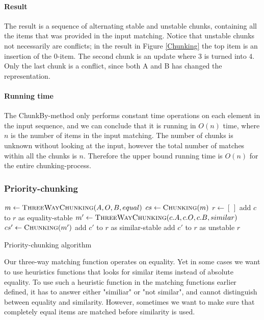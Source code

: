\documentclass[11pt]{article}
\begin{document}

\paragraph{Result} The result is a sequence of alternating stable and unstable chunks, containing all the items that was provided in the input matching. Notice that unstable chunks not necessarily are conflicts; in the result in Figure \ref{Chunking} the top item is an insertion of the $0$-item. The second chunk is an update where $3$ is turned into $4$. Only the last chunk is a conflict, since both A and B has changed the representation. 

\paragraph{Running time} The ChunkBy-method only performs constant time operations on each element in the input sequence, and we can conclude that it is running in $O(n)$ time, where $n$ is the number of items in the input matching. The number of chunks is unknown without looking at the input, however the total number of matches within all the chunks is $n$. Therefore the upper bound running time is $O(n)$ for the entire chunking-process.

\subsubsection{Priority-chunking}
\label{PriorityDiff}

\begin{algorithm}
\begin{algorithmic}
	\State $m \gets \Call{ThreeWayChunking}{A, O, B, equal}$
	\State $cs \gets \Call{Chunking}{m}$
	\State $r \gets [\,]$
			\State add $c$ to $r$ as equality-stable
		\Else
			\State $m' \gets \Call{ThreeWayChunking}{c.A, c.O, c.B, similar} $
            \State $cs' \gets \Call{Chunking}{m'}$
					\State add $c'$ to $r$ as similar-stable
				\Else
					\State add $c'$ to $r$ as unstable
				\EndIf
			\EndFor
		\EndIf
	\EndFor
	\State \Return $r$
\EndFunction
\end{algorithmic}
	\caption{Priority-chunking algorithm}
	\label{PriorityChunk}
\end{algorithm}

Our three-way matching function operates on equality. Yet in some cases we want to use heuristics functions that looks for similar items instead of absolute equality. To use such a heuristic function in the matching functions earlier defined, it has to answer either "similiar" or "not similar", and cannot distinguish between equality and similarity. However, sometimes we want to make sure that completely equal items are matched before similarity is used.
\end{document}
